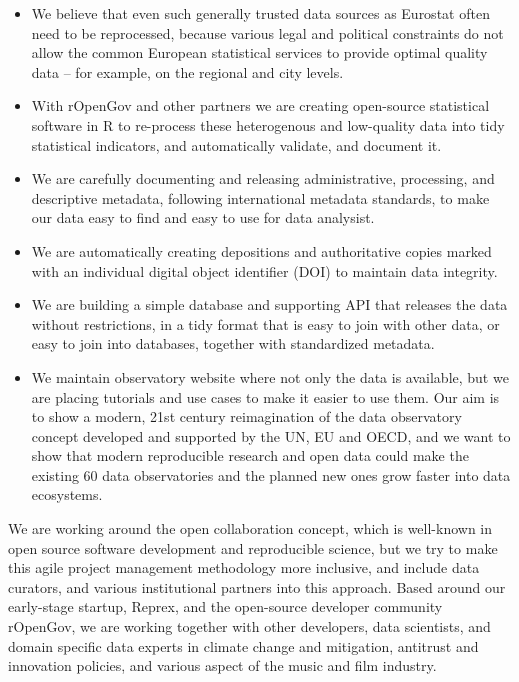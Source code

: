 \documentclass[
  a4paper,
  openany, a4paper, oneside]{book}
\providecommand{\tightlist}{%
  \setlength{\itemsep}{0pt}\setlength{\parskip}{0pt}}
\begin{document}
\begin{itemize}
\tightlist
\item
  We believe that even such generally trusted data sources as Eurostat often need to be reprocessed, because various legal and political constraints do not allow the common European statistical services to provide optimal quality data -- for example, on the regional and city levels.
\item
  With rOpenGov and other partners we are creating open-source statistical software in R to re-process these heterogenous and low-quality data into tidy statistical indicators, and automatically validate, and document it.
\item
  We are carefully documenting and releasing administrative, processing, and descriptive metadata, following international metadata standards, to make our data easy to find and easy to use for data analysist.
\item
  We are automatically creating depositions and authoritative copies marked with an individual digital object identifier (DOI) to maintain data integrity.
\item
  We are building a simple database and supporting API that releases the data without restrictions, in a tidy format that is easy to join with other data, or easy to join into databases, together with standardized metadata.
\item
  We maintain observatory website where not only the data is available, but we are placing tutorials and use cases to make it easier to use them. Our aim is to show a modern, 21st century reimagination of the data observatory concept developed and supported by the UN, EU and OECD, and we want to show that modern reproducible research and open data could make the existing 60 data observatories and the planned new ones grow faster into data ecosystems.
\end{itemize}

We are working around the open collaboration concept, which is well-known in open source software development and reproducible science, but we try to make this agile project management methodology more inclusive, and include data curators, and various institutional partners into this approach. Based around our early-stage startup, Reprex, and the open-source developer community rOpenGov, we are working together with other developers, data scientists, and domain specific data experts in climate change and mitigation, antitrust and innovation policies, and various aspect of the music and film industry.
\end{document}
